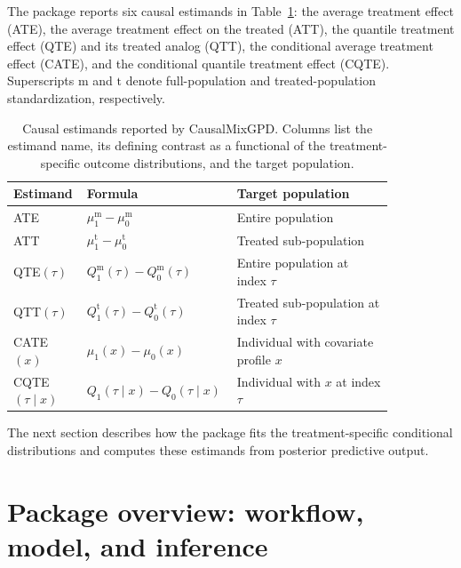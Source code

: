 \documentclass[preprint,12pt,authoryear]{elsarticle}
\newcommand{\pkg}[1]{\textsf{#1}}
\begin{document}
The package reports six causal estimands in
Table~\ref{tab:causal-estimands-main}: the average treatment effect
(ATE), the average treatment effect on the treated (ATT), the quantile
treatment effect (QTE) and its treated analog (QTT), the conditional
average treatment effect (CATE), and the conditional quantile treatment
effect (CQTE).  Superscripts $\mathrm{m}$ and $\mathrm{t}$ denote
full-population and treated-population standardization, respectively.

\begin{table}[!htbp]
\centering
\small
\caption[Causal estimands reported by the package]{Causal estimands reported by \protect\pkg{CausalMixGPD}. Columns list the estimand name, its defining contrast as a functional of the treatment-specific outcome distributions, and the target population.}
\label{tab:causal-estimands-main}
{
\renewcommand{\arraystretch}{1.08}
\begin{tabular}{
  @{}>{\raggedright\arraybackslash}p{0.15\linewidth}
  >{\centering\arraybackslash}p{0.30\linewidth}
  >{\raggedright\arraybackslash}p{0.40\linewidth}@{}
}
\toprule
Estimand & Formula & Target population \\
\midrule
ATE & $\mu_1^{\mathrm{m}}-\mu_0^{\mathrm{m}}$ & Entire population \\
ATT & $\mu_1^{\mathrm{t}}-\mu_0^{\mathrm{t}}$ & Treated sub-population \\
QTE$(\tau)$ & $Q_1^{\mathrm{m}}(\tau)-Q_0^{\mathrm{m}}(\tau)$ & Entire population at index $\tau$\\
QTT$(\tau)$ & $Q_1^{\mathrm{t}}(\tau)-Q_0^{\mathrm{t}}(\tau)$ & Treated sub-population at index $\tau$\\
CATE$(x)$ & $\mu_1(x)-\mu_0(x)$ & Individual with covariate profile $x$ \\
CQTE$(\tau\mid x)$ & $Q_1(\tau\mid x)-Q_0(\tau\mid x)$ & Individual with $x$ at index $\tau$\\
\bottomrule
\end{tabular}
}
\end{table}

The next section describes how the package fits the treatment-specific
conditional distributions and computes these estimands from posterior
predictive output.


\section{Package overview: workflow, model, and inference}
\label{sec:overview}
\end{document}

